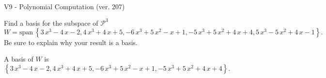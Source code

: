 \begin{exercise}
  \begin{exerciseTitle}V9 - Polynomial Computation (ver. 207)\end{exerciseTitle}
  \begin{exerciseStatement}
    Find a basis for the subspace of \(\mathcal{P}^3\) 
\[W=\mathrm{span}\ \left\{3 \, x^{3} - 4 \, x - 2 , 4 \, x^{3} + 4 \, x + 5 , -6 \, x^{3} + 5 \, x^{2} - x + 1 , -5 \, x^{3} + 5 \, x^{2} + 4 \, x + 4 , 5 \, x^{3} - 5 \, x^{2} + 4 \, x - 1\right\}.\]
 Be sure to explain why your result is a basis.


  \end{exerciseStatement}
  \begin{exerciseAnswer}
   A basis of \(W\) is  \(\left\{3 \, x^{3} - 4 \, x - 2 , 4 \, x^{3} + 4 \, x + 5 , -6 \, x^{3} + 5 \, x^{2} - x + 1 , -5 \, x^{3} + 5 \, x^{2} + 4 \, x + 4\right\}\).
  


  \end{exerciseAnswer}
\end{exercise}